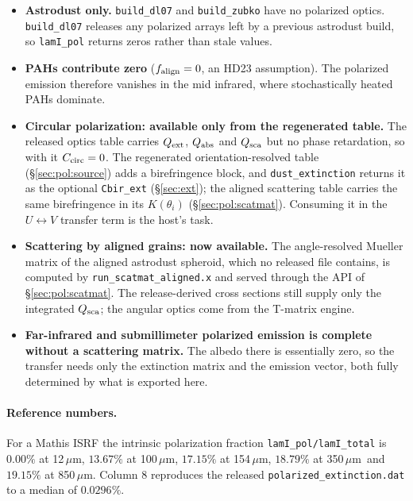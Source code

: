 \documentclass{my_memo}
\newcommand{\code}[1]{\texttt{#1}}
\newcommand{\um}{\ensuremath{\,\mu\mathrm{m}}}
\begin{document}
\begin{itemize}
\item \textbf{Astrodust only.} \code{build\_dl07} and \code{build\_zubko} have
      no polarized optics. \code{build\_dl07} releases any polarized arrays left
      by a previous astrodust build, so \code{lamI\_pol} returns zeros rather
      than stale values.
\item \textbf{PAHs contribute zero} ($f_{\rm align}=0$, an HD23 assumption).
      The polarized emission therefore vanishes in the mid infrared, where
      stochastically heated PAHs dominate.
\item \textbf{Circular polarization: available only from the regenerated table.}
      The released optics table carries $Q_{\rm ext}$, $Q_{\rm abs}$ and
      $Q_{\rm sca}$ but no phase retardation, so with it $C_{\rm circ}=0$. The
      regenerated orientation-resolved table (\S\ref{sec:pol:source}) adds a
      birefringence block, and \code{dust\_extinction} returns it as the optional
      \code{Cbir\_ext} (\S\ref{sec:ext}); the aligned scattering table carries the
      same birefringence in its $K(\theta_i)$ (\S\ref{sec:pol:scatmat}).
      Consuming it in the $U\leftrightarrow V$ transfer term is the host's task.
\item \textbf{Scattering by aligned grains: now available.} The angle-resolved
      Mueller matrix of the aligned astrodust spheroid, which no released file
      contains, is computed by \code{run\_scatmat\_aligned.x} and served through
      the API of \S\ref{sec:pol:scatmat}. The release-derived cross sections still
      supply only the integrated $Q_{\rm sca}$; the angular optics come from the
      T-matrix engine.
\item \textbf{Far-infrared and submillimeter polarized emission is complete
      without a scattering matrix.} The albedo there is essentially zero, so the
      transfer needs only the extinction matrix and the emission vector, both
      fully determined by what is exported here.
\end{itemize}

\paragraph{Reference numbers.} For a Mathis ISRF the intrinsic polarization
fraction \code{lamI\_pol/lamI\_total} is $0.00\%$ at 12\um, $13.67\%$ at
100\um, $17.15\%$ at 154\um, $18.79\%$ at 350\um\ and $19.15\%$ at 850\um.
Column 8 reproduces the released \code{polarized\_extinction.dat} to a median
of $0.0296\%$.
\end{document}
